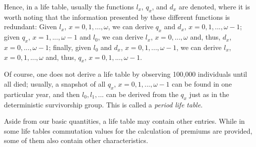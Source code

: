\documentclass[11pt,fleqn,oneside]{book}
\begin{document}
Hence, in a life table, usually the functions $l_x$, $q_x$, and $d_x$ are denoted, where it is worth noting that the information presented by these different functions is redundant: Given $l_x$, $x=0,1,...,\omega$, we can derive $q_x$ and $d_x$, $x=0,1,...,\omega - 1$; given $q_x$, $x=1,...,\omega-1$ and $l_0$, we can derive $l_x$, $x=0,...,\omega$ and, thus, $d_x$, $x=0,...,\omega-1$; finally, given $l_0$ and $d_x$, $x=0,1,...,\omega-1$, we can derive $l_x$, $x=0,1,...,\omega$ and, thus, $q_x$, $x=0,1,...,\omega-1$.

Of course, one does not derive a life table by observing 100,000 individuals until all died; usually, a snapshot of all $q_x$, $x=0,1,...,\omega-1$ can be found in one particular year, and then $l_0,l_1,...$ can be derived from the $q_x$ just as in the deterministic survivorship group. This is called a \textit{period life table}.

Aside from our basic quantities, a life table may contain other entries. While in some life tables commutation values for the calculation of premiums are provided, some of them also contain other characteristics.
\end{document}
